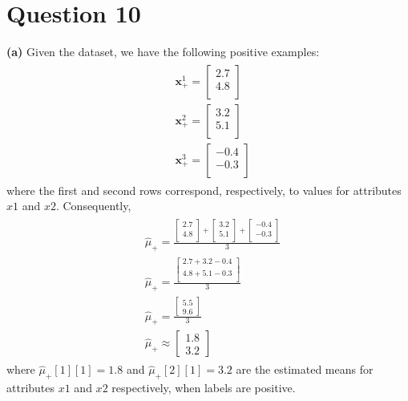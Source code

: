 \documentclass[leqno]{article}
\begin{document}
\section*{Question 10} \textbf{(a)} Given the dataset, we have the following positive examples:
\begin{gather*}
\begin{split}
&\textbf{x}_+^1 = 
 \begin{bmatrix}
   2.7 \\
   4.8 \\
 \end{bmatrix}\\
&\textbf{x}_+^2 = 
 \begin{bmatrix}
   3.2 \\
   5.1 \\
\end{bmatrix}\\
&\textbf{x}_+^3 = 
 \begin{bmatrix}
   -0.4 \\
   -0.3\\
 \end{bmatrix}
\end{split}
\end{gather*}
where the first and second rows correspond, respectively, to values for attributes $x1$ and $x2$. 
Consequently,  
\begin{gather*}
\begin{split}
&\hat{\mu}_+ = 
 \frac{ \begin{bmatrix}
   2.7 \\
   4.8\\ 
 \end{bmatrix} +  \begin{bmatrix}
   3.2 \\
   5.1\\ 
 \end{bmatrix} +  \begin{bmatrix}
   -0.4 \\
   -0.3 \\
 \end{bmatrix}}{3}\\
&\hat{\mu}_+ = 
 \frac{\begin{bmatrix}
   2.7 + 3.2 - 0.4\\
   4.8 + 5.1 - 0.3\\ 
   \end{bmatrix}}{3}\\
&\hat{\mu}_+ = 
 \frac{\begin{bmatrix}
   5.5\\
   9.6 
   \end{bmatrix}}{3}\\
&\hat{\mu}_+ \approx 
\begin{bmatrix}
   1.8\\
   3.2 
   \end{bmatrix}
\end{split}
\end{gather*}
where $\hat{\mu}_+[1][1] = 1.8$ and $\hat{\mu}_+[2][1] = 3.2$ are the estimated means for attributes $x1$ and $x2$ respectively, when labels are positive.
\end{document}
